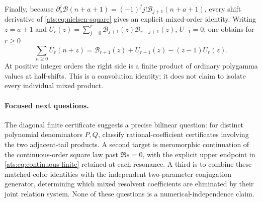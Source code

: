 Finally, because $\partial_a^j\mathcal B(n+a+1)=
(-1)^j j!\mathcal B_{j+1}(n+a+1)$, every shift derivative of
\eqref{ats:eq:nielsen-square} gives an explicit mixed-order identity.
Writing $z=a+1$ and
$U_r(z)=\sum_{j=0}^{r}\mathcal B_{j+1}(z)\mathcal B_{r-j+1}(z)$,
$U_{-1}=0$, one obtains for $r\ge0$
\begin{equation}\label{ats:eq:shift-convolution}
 \sum_{n\ge0}U_r(n+z)
 =\mathcal B_{r+1}(z)+U_{r-1}(z)-(z-1)U_r(z).
\end{equation}
At positive integer orders the right side is a finite product of
ordinary polygamma values at half-shifts.  This is a convolution
identity; it does not claim to isolate every individual mixed product.

\paragraph{Focused next questions.}
The diagonal finite certificate suggests a precise bilinear question:
for distinct polynomial denominators $P,Q$, classify rational-coefficient
certificates involving the two adjacent-tail products. A second target
is meromorphic continuation of the continuous-order square law past
$\Re s=0$, with the explicit upper endpoint in
\eqref{ats:eq:continuous-finite} retained at each resonance. A third is
to combine these matched-color identities with the independent
two-parameter conjugation generator, determining which mixed resolvent
coefficients are eliminated by their joint relation system. None of
these questions is a numerical-independence claim.
